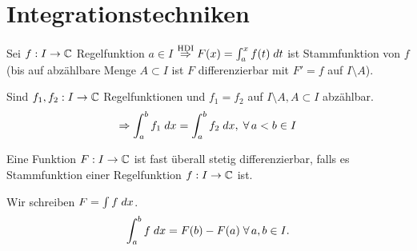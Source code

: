 \documentclass[../ana2.tex]{subfiles}
\begin{document}
\setcounter{section}{5}
\section{Integrationstechniken}
Sei \( \abb{f}{I}{\C} \) Regelfunktion \( a \in I\)
\( \oversett{HDI}{\Rightarrow} F(x) = \integralx{f(t)}{a}{x}{t} \)
ist Stammfunktion von \(f\) (bis auf abzählbare Menge 
\( A \subset I \) ist \(F\) differenzierbar mit 
\( F' = f \) auf \( I \setminus A \)).
\begin{bem}
    Sind \( f_1, f_2 : I \rightarrow \C \) Regelfunktionen
    und \(f_1 = f_2\) auf \( I \setminus A, A \subset I \) 
    abzählbar.
    \[ \Rightarrow \integral{f_1}{a}{b} = \integral{f_2}{a}{b},
    \; \forall a < b \in I \]
\end{bem}
\begin{defi}
    Eine Funktion \( \abb{F}{I}{\C} \) ist fast überall 
    stetig differenzierbar, falls es Stammfunktion einer 
    Regelfunktion \( \abb{f}{I}{\C} \) ist.
\end{defi}
\begin{notation}
    Wir schreiben \( F = \int f \dx \).
    \[ \integral{f}{a}{b} = F(b) - F(a) \;\forall a,b\in I. \]
\end{notation}
\end{document}
